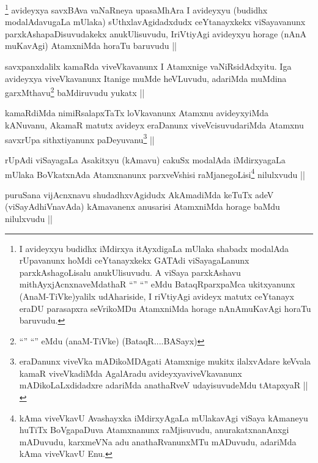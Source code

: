 
\begin{artha}
\footnote{I avideyxyu budidhx iMdirxya itAyxdigaLa mUlaka shabadx modalAda rUpavanunx hoMdi ceYtanayxkekx GATAdi viSayagaLanunx parxkAshagoLisalu anukUlisuvudu. A viSaya parxkAshavu mithAyxjAcnxnaveMdathaR ``\stext'' ``\stext'' eMdu BataqRparxpaMca ukitxyanunx (AnaM-TiVke)yalilx udAhariside, I riVtiyAgi avideyx matutx ceYtanayx eraDU parasapxra seVrikoMDu AtamxniMda horage nAnAmuKavAgi horaTu baruvudu.}
avideyxya savxBAva vaNaRneya upasaMhAra I avideyxyu (budidhx modalAdavugaLa mUlaka) sUthxlavAgidadxdudx ceYtanayxkekx viSayavanunx parxkAshapaDisuvudakekx anukUlisuvudu, IriVtiyAgi avideyxyu horage (nAnA muKavAgi) AtamxniMda horaTu baruvudu ||
\end{artha}

\begin{artha}
savxpanxdalilx kamaRda viveVkavanunx I Atamxnige vaNiRsidAdxyitu. Iga avideyxya viveVkavanunx Itanige muMde heVLuvudu, adariMda muMdina garxMthavu\footnote{``\stext'' ``\stext'' eMdu (anaM-TiVke) (BataqR....BASayx)} baMdiruvudu yukatx ||
\end{artha}


\begin{artha}
kamaRdiMda nimiRsalapxTaTx loVkavanunx Atamxnu avideyxyiMda kANuvanu, AkamaR matutx avideyx eraDanunx viveVcisuvudariMda Atamxnu savxrUpa sithxtiyanunx paDeyuvanu\footnote{eraDanunx viveVka mADikoMDAgati Atamxnige mukitx ilalxvAdare keVvala kamaR viveVkadiMda AgalAradu avideyxyaviveVkavanunx mADikoLaLxdidadxre adariMda anathaRveV udayisuvudeMdu tAtapxyaR ||} ||
\end{artha}


\begin{artha}
rUpAdi viSayagaLa Asakitxyu (kAmavu) cakuSx modalAda iMdirxyagaLa mUlaka BoVkatxnAda Atamxnanunx parxveVshisi raMjanegoLisi\footnote{kAma viveVkavU Avashayxka iMdirxyAgaLa mUlakavAgi viSaya kAmaneyu huTiTx BoVgapaDuva Atamxnanunx raMjisuvudu, anurakatxnanAnxgi mADuvudu, karxmeVNa adu anathaRvanunxMTu mADuvudu, adariMda kAma viveVkavU Enu.} nilulxvudu ||
\end{artha}

\begin{artha}
puruSana vijAcnxnavu shudadhxvAgidudx AkAmadiMda keTuTx adeV (viSayAdhiVnavAda) kAmavanenx anusarisi AtamxniMda horage baMdu nilulxvudu ||
\end{artha}


